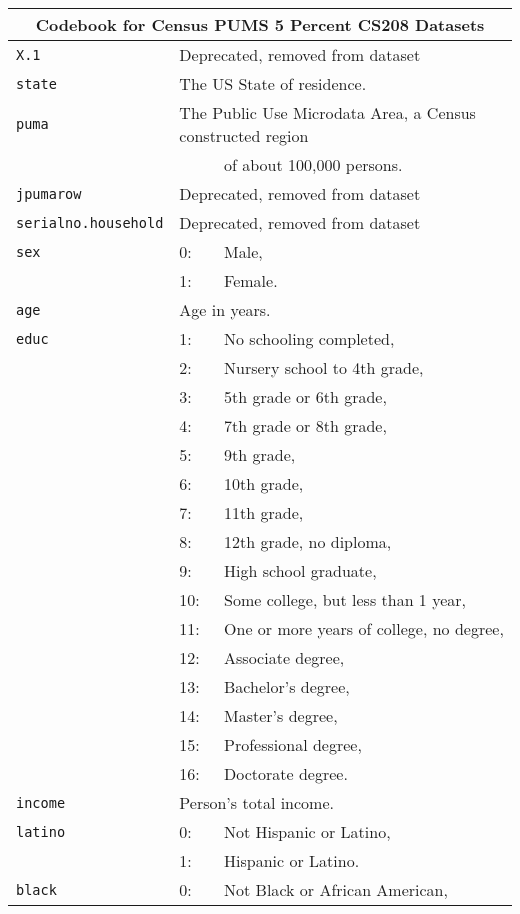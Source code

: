 \documentclass[11pt]{article}
\begin{document}
\newpage
\vspace{-1cm}
\begin{tabular}{lll}
\multicolumn{3}{c}{\textbf{Codebook for Census PUMS 5 Percent CS208 Datasets}}\\
\hline
\texttt{X.1} &\multicolumn{2}{l}{Deprecated, removed from dataset}\\
\texttt{state} &\multicolumn{2}{l}{The US State of residence.}\\
\texttt{puma} &\multicolumn{2}{l}{The Public Use Microdata Area, a Census constructed region}\\ 
&& of about 100,000 persons.\\
\texttt{jpumarow} &\multicolumn{2}{l}{Deprecated, removed from dataset}\\
\texttt{serialno.household} &\multicolumn{2}{l}{Deprecated, removed from dataset}\\
\texttt{sex} & 0: &Male, \\
            &    1: &Female.\\
\texttt{age} &\multicolumn{2}{l}{Age in years.}\\
\texttt{educ} & 1:&		No schooling completed,\\
&2:&		Nursery school to 4th grade,\\
&3:&		5th grade or 6th grade,\\
&4:&		7th grade or 8th grade,\\
&5:&		9th grade,\\
&6:&		10th grade,\\
&7:&		11th grade,\\
&8:&		12th grade, no diploma,\\
&9:&		High school graduate,\\
&10:&		Some college, but less than 1 year,\\
&11:&		One or more years of college, no degree,\\
&12:&		Associate degree,\\
&13:&		Bachelor's degree,\\
&14:&		Master's degree,\\
&15:&		Professional degree,\\
&16:&		Doctorate degree.\\
\texttt{income} &\multicolumn{2}{l}{Person's total income.} \\
\texttt{latino} & 0: & Not Hispanic or Latino,\\
                & 1: & Hispanic or Latino.\\
\texttt{black} & 0: & Not Black or African American,\\

\end{tabular}
\end{document}
